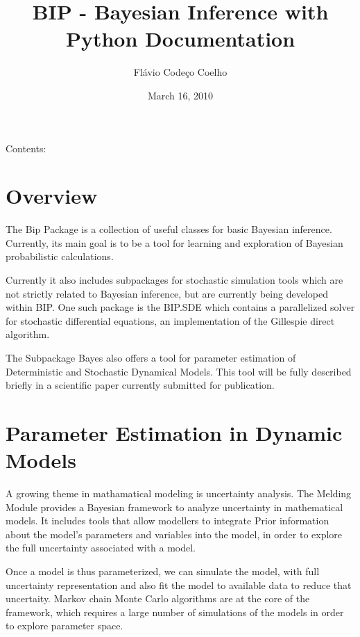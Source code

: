 \documentclass[a4paper,10pt,english]{manual}
\title{BIP - Bayesian Inference with Python Documentation}
\date{March 16, 2010}
\author{Flávio Codeço Coelho}
\begin{document}
\maketitle
\tableofcontents
\hypertarget{--doc-index}{}


Contents:

\resetcurrentobjects
\hypertarget{--doc-overview}{}

\chapter{Overview}

The Bip Package is a collection of useful classes for basic Bayesian inference. Currently, its main goal is to be a tool for learning and exploration of Bayesian probabilistic calculations.

Currently it also includes subpackages for stochastic simulation tools which are not strictly related to Bayesian inference, but are currently being developed within BIP. One such package is the BIP.SDE which contains a parallelized solver for stochastic differential equations, an implementation of the Gillespie direct algorithm.

The Subpackage Bayes also offers a tool for parameter estimation of Deterministic and Stochastic Dynamical Models. This tool will be fully described briefly in a scientific paper currently submitted for publication.

\resetcurrentobjects
\hypertarget{--doc-paramest}{}

\chapter{Parameter Estimation in Dynamic Models}

A growing theme in mathamatical modeling is uncertainty analysis. The Melding Module provides a Bayesian framework to analyze uncertainty in mathematical models. It includes tools that allow modellers to integrate Prior information about the model's parameters and variables into the model, in order to explore the full uncertainty associated with a model.

Once a model is thus parameterized, we can simulate the model, with full uncertainty representation and also fit the model to available data to reduce that uncertaity. Markov chain Monte Carlo algorithms are at the core of the framework, which requires a large number of simulations of the models in order to explore parameter space.
\end{document}
